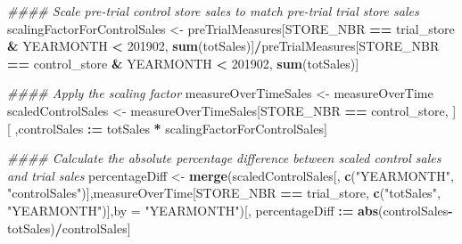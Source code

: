 \documentclass[
]{article}
\newenvironment{Shaded}{\begin{snugshade}}{\end{snugshade}}
\newcommand{\CommentTok}[1]{\textcolor[rgb]{0.56,0.35,0.01}{\textit{#1}}}
\newcommand{\DataTypeTok}[1]{\textcolor[rgb]{0.13,0.29,0.53}{#1}}
\newcommand{\DecValTok}[1]{\textcolor[rgb]{0.00,0.00,0.81}{#1}}
\newcommand{\ErrorTok}[1]{\textcolor[rgb]{0.64,0.00,0.00}{\textbf{#1}}}
\newcommand{\KeywordTok}[1]{\textcolor[rgb]{0.13,0.29,0.53}{\textbf{#1}}}
\newcommand{\NormalTok}[1]{#1}
\newcommand{\OperatorTok}[1]{\textcolor[rgb]{0.81,0.36,0.00}{\textbf{#1}}}
\newcommand{\StringTok}[1]{\textcolor[rgb]{0.31,0.60,0.02}{#1}}
\begin{document}
\begin{Shaded}
\begin{Highlighting}[]
\CommentTok{#### Scale pre-trial control store sales to match pre-trial trial store sales}
\NormalTok{scalingFactorForControlSales <-}\StringTok{ }\NormalTok{preTrialMeasures[STORE_NBR }\OperatorTok{==}\StringTok{ }\NormalTok{trial_store }\OperatorTok{&}
\NormalTok{YEARMONTH }\OperatorTok{<}\StringTok{ }\DecValTok{201902}\NormalTok{, }\KeywordTok{sum}\NormalTok{(totSales)]}\OperatorTok{/}\NormalTok{preTrialMeasures[STORE_NBR }\OperatorTok{==}
\NormalTok{control_store }\OperatorTok{&}\StringTok{ }\NormalTok{YEARMONTH }\OperatorTok{<}\StringTok{ }\DecValTok{201902}\NormalTok{, }\KeywordTok{sum}\NormalTok{(totSales)]}

\CommentTok{#### Apply the scaling factor}
\NormalTok{measureOverTimeSales <-}\StringTok{ }\NormalTok{measureOverTime}
\NormalTok{scaledControlSales <-}\StringTok{ }\NormalTok{measureOverTimeSales[STORE_NBR }\OperatorTok{==}\StringTok{ }\NormalTok{control_store, ][ ,controlSales }\OperatorTok{:}\ErrorTok{=}\StringTok{ }\NormalTok{totSales }\OperatorTok{*}\StringTok{ }\NormalTok{scalingFactorForControlSales]}

\CommentTok{#### Calculate the absolute percentage difference between scaled control sales and trial sales}
\NormalTok{percentageDiff <-}\StringTok{ }\KeywordTok{merge}\NormalTok{(scaledControlSales[, }\KeywordTok{c}\NormalTok{(}\StringTok{"YEARMONTH"}\NormalTok{, }\StringTok{"controlSales"}\NormalTok{)],measureOverTime[STORE_NBR }\OperatorTok{==}\StringTok{ }\NormalTok{trial_store, }\KeywordTok{c}\NormalTok{(}\StringTok{"totSales"}\NormalTok{, }\StringTok{"YEARMONTH"}\NormalTok{)],}\DataTypeTok{by =} \StringTok{"YEARMONTH"}\NormalTok{)[, percentageDiff }\OperatorTok{:}\ErrorTok{=}\StringTok{ }\KeywordTok{abs}\NormalTok{(controlSales}\OperatorTok{-}\NormalTok{totSales)}\OperatorTok{/}\NormalTok{controlSales]}


\end{Highlighting}
\end{Shaded}
\end{document}
